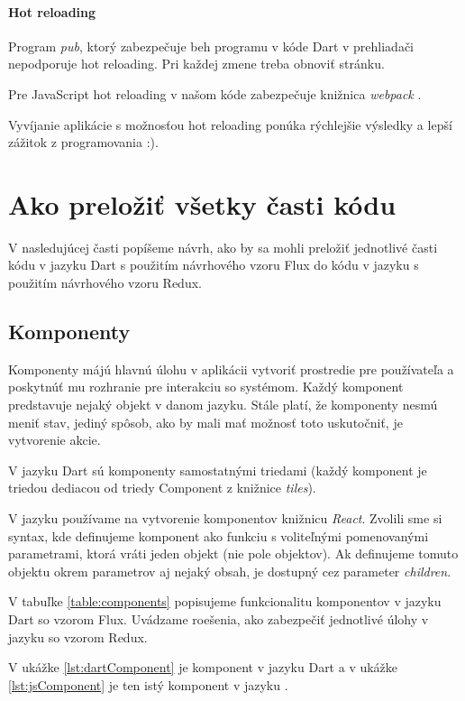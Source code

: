 \paragraph{Hot reloading}
Program \emph{pub}, ktorý zabezpečuje beh programu v kóde Dart v prehliadači nepodporuje hot reloading. Pri každej zmene treba obnoviť stránku.

Pre JavaScript hot reloading v našom kóde zabezpečuje knižnica \emph{webpack} \cite{webpack}.

Vyvíjanie aplikácie s možnosťou hot reloading ponúka rýchlejšie výsledky a lepší zážitok z programovania :).

\section{Ako preložiť všetky časti kódu}

V nasledujúcej časti popíšeme návrh, ako by sa mohli preložiť jednotlivé časti kódu v jazyku Dart s použitím návrhového vzoru Flux do kódu v jazyku \JS{} s použitím návrhového vzoru Redux.

\subsection{Komponenty}
Komponenty májú hlavnú úlohu v aplikácii vytvoriť prostredie pre používateľa a poskytnúť mu rozhranie pre interakciu so systémom. Každý komponent predstavuje nejaký objekt v danom jazyku. 
Stále platí, že komponenty nesmú meniť stav, jediný spôsob, ako by mali mať možnosť toto uskutočniť, je vytvorenie akcie.

V jazyku Dart sú komponenty samostatnými triedami (každý komponent je triedou dediacou od triedy Component z knižnice \emph{tiles}).

V jazyku \JS{} používame na vytvorenie komponentov knižnicu \emph{React}. Zvolili sme si syntax, kde definujeme komponent ako funkciu s voliteľnými pomenovanými parametrami, ktorá vráti jeden objekt (nie pole objektov). 
Ak definujeme tomuto objektu okrem parametrov aj nejaký obsah, je dostupný cez parameter \emph{children}.

V tabuľke \ref{table:components} popisujeme funkcionalitu komponentov v jazyku Dart so vzorom Flux. Uvádzame roešenia, ako zabezpečiť jednotlivé úlohy v jazyku \JS{} so vzorom Redux.

V ukážke \ref{lst:dartComponent} je komponent v jazyku Dart a v ukážke \ref{lst:jsComponent} je ten istý komponent v jazyku \JS{}.


